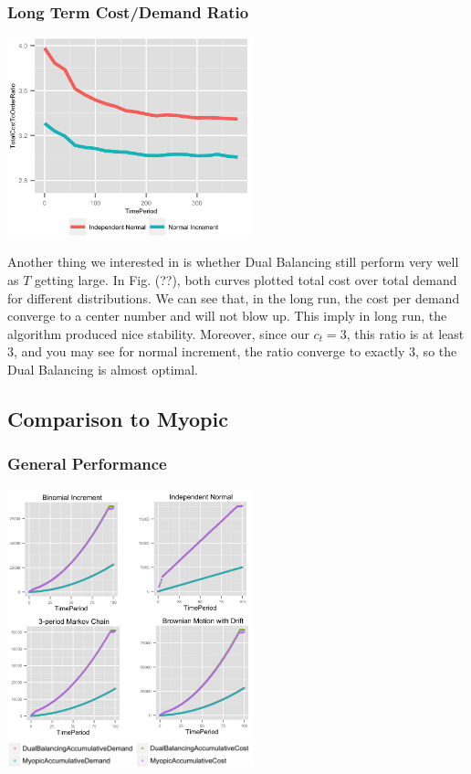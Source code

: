 \documentclass[twoside]{article}
\begin{document}
\begin{multicols}{2}
\subsubsection{Long Term Cost/Demand Ratio}
\begin{center}
  \includegraphics[width=2.8in]{figures/TotalCostToOrderRatio.png}
\end{center}
Another thing we interested in is whether Dual Balancing still perform very well as $T$ getting large. In Fig. (??), both curves plotted total cost over total demand for different distributions. We can see that, in the long run, the cost per demand converge to a center number and will not blow up. This imply in long run, the algorithm produced nice stability. Moreover, since our $c_t=3$, this ratio is at least 3, and you may see for normal increment, the ratio converge to exactly 3, so the Dual Balancing is almost optimal. 

\subsection{Comparison to Myopic}
\subsubsection{General Performance}

\begin{center}
  \includegraphics[width=2.8in]{figures/AccumulativeDemandAndCost.png}
  \includegraphics[width=2.8in]{figures/key.png}
\end{center}


\end{multicols}
\end{document}
